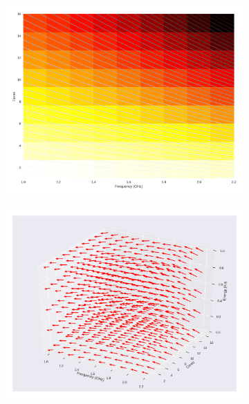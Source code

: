\begin{figure}[H]
	\centering
	\begin{subfigure}[b]{0.45\textwidth}
		\includegraphics[width=\textwidth]{models/figures/analisys/pstatic0.png}
	\end{subfigure}
	\begin{subfigure}[b]{0.45\textwidth}
		\includegraphics[width=\textwidth]{models/figures/analisys/pstatic0_3d.png}
	\end{subfigure}
\end{figure}

